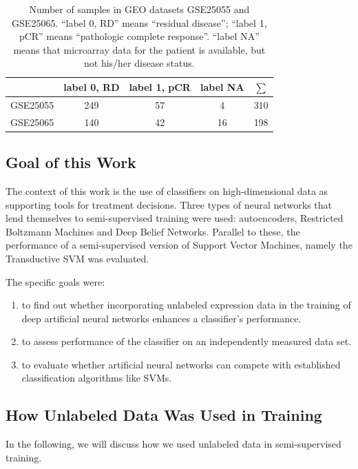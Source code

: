 \begin{table}
\begin{centering}
\begin{tabular}{|c|c|c|c|c|}
\hline 
 & label 0, RD & label 1, pCR & label NA & $\sum$\tabularnewline
\hline 
\hline 
GSE25055 & 249 & 57 & 4 & 310\tabularnewline
\hline 
GSE25065 & 140 & 42 & 16 & 198\tabularnewline
\hline 
\end{tabular}
\par\end{centering}
\caption[Number of samples in GEO datasets GSE25055 and GSE25065.]{\label{tab:GSE25055-GSE25065-sample-number}Number of samples in
GEO datasets GSE25055 and GSE25065. ``label 0, RD'' means ``residual
disease''; ``label 1, pCR'' means ``pathologic complete response''.
``label NA'' means that microarray data for the patient is available,
but not his/her disease status.}
\end{table}

\subsection{Goal of this Work}

The context of this work is the use of classifiers on high-dimensional
data as supporting tools for treatment decisions. Three types of neural
networks that lend themselves to semi-supervised training were used:
autoencoders, Restricted Boltzmann Machines and Deep Belief Networks.
Parallel to these, the performance of a semi-supervised version of
Support Vector Machines, namely the Transductive SVM was evaluated.

The specific goals were:
\begin{enumerate}
\item to find out whether incorporating unlabeled expression data in the
training of deep artificial neural networks enhances a classifier's
performance.
\item to assess performance of the classifier on an independently measured
data set.
\item to evaluate whether artificial neural networks can compete with established
classification algorithms like SVMs.
\end{enumerate}

\subsection{How Unlabeled Data Was Used in Training}

In the following, we will discuss how we used unlabeled data in semi-supervised
training.

